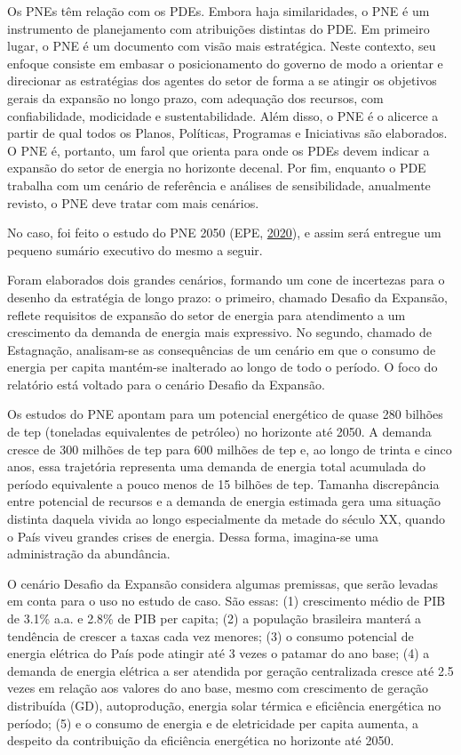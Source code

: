 \documentclass[aprovado,numbers]{coppe}
\begin{document}
  Os PNEs têm relação com os PDEs. Embora haja similaridades, o PNE é um instrumento de planejamento com atribuições distintas do PDE. Em primeiro lugar, o PNE é um documento com visão mais estratégica. Neste contexto, seu enfoque consiste em embasar o posicionamento do governo de modo a orientar e direcionar as estratégias dos agentes do setor de forma a se atingir os objetivos gerais da expansão no longo prazo, com adequação dos recursos, com confiabilidade, modicidade e sustentabilidade. Além disso, o PNE é o alicerce a partir de qual todos os Planos, Políticas, Programas e Iniciativas são elaborados. O PNE é, portanto, um farol que orienta para onde os PDEs devem indicar a expansão do setor de energia no horizonte decenal. Por fim, enquanto o PDE trabalha com um cenário de referência e análises de sensibilidade, anualmente revisto, o PNE deve tratar com mais cenários.

  No caso, foi feito o estudo do PNE 2050 (EPE, \protect\hyperlink{ref-epe2020}{2020}), e assim será entregue um pequeno sumário executivo do mesmo a seguir.

  Foram elaborados dois grandes cenários, formando um cone de incertezas para o desenho da estratégia de longo prazo: o primeiro, chamado Desafio da Expansão, reflete requisitos de expansão do setor de energia para atendimento a um crescimento da demanda de energia mais expressivo. No segundo, chamado de Estagnação, analisam-se as consequências de um cenário em que o consumo de energia per capita mantém-se inalterado ao longo de todo o período. O foco do relatório está voltado para o cenário Desafio da Expansão.

  Os estudos do PNE apontam para um potencial energético de quase 280 bilhões de tep (toneladas equivalentes de petróleo) no horizonte até 2050. A demanda cresce de 300 milhões de tep para 600 milhões de tep e, ao longo de trinta e cinco anos, essa trajetória representa uma demanda de energia total acumulada do período equivalente a pouco menos de 15 bilhões de tep. Tamanha discrepância entre potencial de recursos e a demanda de energia estimada gera uma situação distinta daquela vivida ao longo especialmente da metade do século XX, quando o País viveu grandes crises de energia. Dessa forma, imagina-se uma administração da abundância.

  O cenário Desafio da Expansão considera algumas premissas, que serão levadas em conta para o uso no estudo de caso. São essas: (1) crescimento médio de PIB de 3.1\% a.a. e 2.8\% de PIB per capita; (2) a população brasileira manterá a tendência de crescer a taxas cada vez menores; (3) o consumo potencial de energia elétrica do País pode atingir até 3 vezes o patamar do ano base; (4) a demanda de energia elétrica a ser atendida por geração centralizada cresce até 2.5 vezes em relação aos valores do ano base, mesmo com crescimento de geração distribuída (GD), autoprodução, energia solar térmica e eficiência energética no período; (5) e o consumo de energia e de eletricidade per capita aumenta, a despeito da contribuição da eficiência energética no horizonte até 2050.
\end{document}
